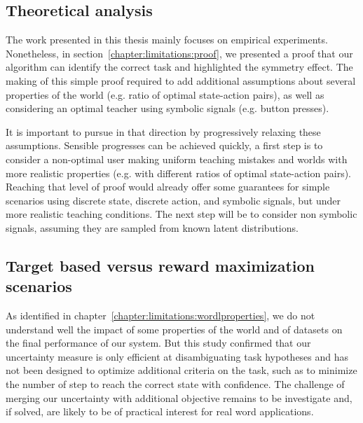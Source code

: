 
\subsection{Theoretical analysis}

The work presented in this thesis mainly focuses on empirical experiments. Nonetheless, in section~\ref{chapter:limitations:proof}, we presented a proof that our algorithm can identify the correct task and highlighted the symmetry effect. The making of this simple proof required to add additional assumptions about several properties of the world (e.g. ratio of optimal state-action pairs), as well as considering an optimal teacher using symbolic signals (e.g. button presses). 

It is important to pursue in that direction by progressively relaxing these assumptions. Sensible progresses can be achieved quickly, a first step is to consider a non-optimal user making uniform teaching mistakes and worlds with more realistic properties (e.g. with different ratios of optimal state-action pairs). Reaching that level of proof would already offer some guarantees for simple scenarios using discrete state, discrete action, and symbolic signals, but under more realistic teaching conditions. The next step will be to consider non symbolic signals, assuming they are sampled from known latent distributions.



\subsection{Target based versus reward maximization scenarios}

As identified in chapter~\ref{chapter:limitations:wordlproperties}, we do not understand well the impact of some properties of the world and of datasets on the final performance of our system. But this study confirmed that our uncertainty measure is only efficient at disambiguating task hypotheses and has not been designed to optimize additional criteria on the task, such as to minimize the number of step to reach the correct state with confidence. The challenge of merging our uncertainty with additional objective remains to be investigate and, if solved, are likely to be of practical interest for real word applications.

